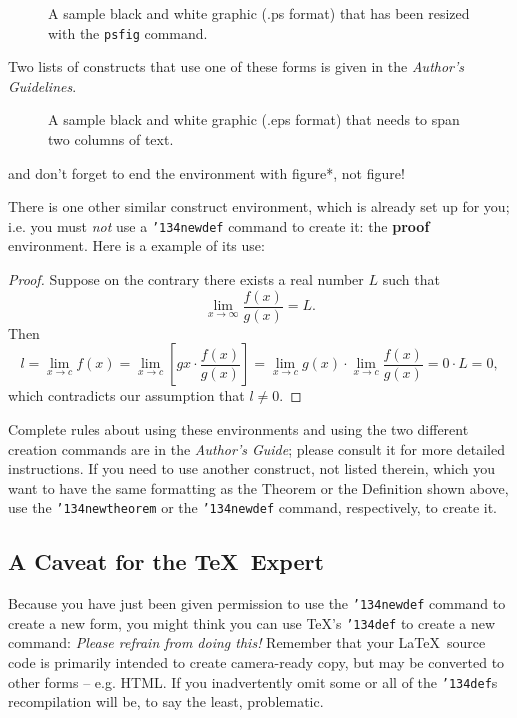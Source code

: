 \documentclass{acm_proc_article-sp}
\begin{document}
\begin{figure}
\centering
{}
\caption{A sample black and white graphic (.ps format) that has
been resized with the \texttt{psfig} command.}
\end{figure}

Two lists of constructs that use one of these
forms is given in the
\textit{Author's  Guidelines}.

\begin{figure}
\centering
{}
\caption{A sample black and white graphic (.eps format)
that needs to span two columns of text.}
\end{figure}
and don't forget to end the environment with
{figure*}, not {figure}!

There is one other similar construct environment, which is
already set up
for you; i.e. you must \textit{not} use
a \texttt{{\char'134}newdef} command to
create it: the \textbf{proof} environment.  Here
is a example of its use:
\begin{proof}
Suppose on the contrary there exists a real number $L$ such that
\begin{displaymath}
\lim_{x\rightarrow\infty} \frac{f(x)}{g(x)} = L.
\end{displaymath}
Then
\begin{displaymath}
l=\lim_{x\rightarrow c} f(x)
= \lim_{x\rightarrow c}
\left[ g{x} \cdot \frac{f(x)}{g(x)} \right ]
= \lim_{x\rightarrow c} g(x) \cdot \lim_{x\rightarrow c}
\frac{f(x)}{g(x)} = 0\cdot L = 0,
\end{displaymath}
which contradicts our assumption that $l\neq 0$.
\end{proof}

Complete rules about using these environments and using the
two different creation commands are in the
\textit{Author's Guide}; please consult it for more
detailed instructions.  If you need to use another construct,
not listed therein, which you want to have the same
formatting as the Theorem
or the Definition\cite{salas:calculus} shown above,
use the \texttt{{\char'134}newtheorem} or the
\texttt{{\char'134}newdef} command,
respectively, to create it.

\subsection*{A {\secit Caveat} for the \TeX\ Expert}
Because you have just been given permission to
use the \texttt{{\char'134}newdef} command to create a
new form, you might think you can
use \TeX's \texttt{{\char'134}def} to create a
new command: \textit{Please refrain from doing this!}
Remember that your \LaTeX\ source code is primarily intended
to create camera-ready copy, but may be converted
to other forms -- e.g. HTML. If you inadvertently omit
some or all of the \texttt{{\char'134}def}s recompilation will
be, to say the least, problematic.
\end{document}

